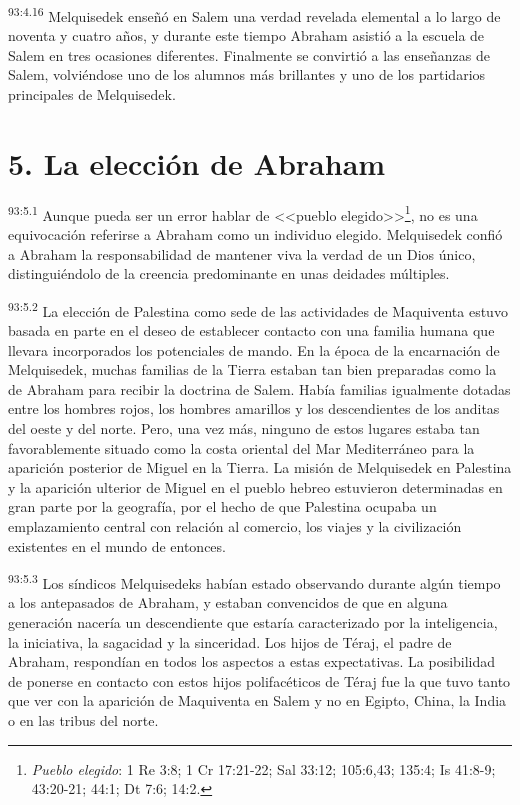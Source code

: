 \par
\textsuperscript{93:4.16} Melquisedek enseñó en Salem una verdad revelada elemental a lo largo de noventa y cuatro años, y durante este tiempo Abraham asistió a la escuela de Salem en tres ocasiones diferentes. Finalmente se convirtió a las enseñanzas de Salem, volviéndose uno de los alumnos más brillantes y uno de los partidarios principales de Melquisedek.

\section*{5. La elección de Abraham}
\par
\textsuperscript{93:5.1} Aunque pueda ser un error hablar de <<pueblo elegido>>\footnote{\textit{Pueblo elegido}: 1 Re 3:8; 1 Cr 17:21-22; Sal 33:12; 105:6,43; 135:4; Is 41:8-9; 43:20-21; 44:1; Dt 7:6; 14:2.}, no es una equivocación referirse a Abraham como un individuo elegido. Melquisedek confió a Abraham la responsabilidad de mantener viva la verdad de un Dios único, distinguiéndolo de la creencia predominante en unas deidades múltiples.

\par
\textsuperscript{93:5.2} La elección de Palestina como sede de las actividades de Maquiventa estuvo basada en parte en el deseo de establecer contacto con una familia humana que llevara incorporados los potenciales de mando. En la época de la encarnación de Melquisedek, muchas familias de la Tierra estaban tan bien preparadas como la de Abraham para recibir la doctrina de Salem. Había familias igualmente dotadas entre los hombres rojos, los hombres amarillos y los descendientes de los anditas del oeste y del norte. Pero, una vez más, ninguno de estos lugares estaba tan favorablemente situado como la costa oriental del Mar Mediterráneo para la aparición posterior de Miguel en la Tierra. La misión de Melquisedek en Palestina y la aparición ulterior de Miguel en el pueblo hebreo estuvieron determinadas en gran parte por la geografía, por el hecho de que Palestina ocupaba un emplazamiento central con relación al comercio, los viajes y la civilización existentes en el mundo de entonces.

\par
\textsuperscript{93:5.3} Los síndicos Melquisedeks habían estado observando durante algún tiempo a los antepasados de Abraham, y estaban convencidos de que en alguna generación nacería un descendiente que estaría caracterizado por la inteligencia, la iniciativa, la sagacidad y la sinceridad. Los hijos de Téraj, el padre de Abraham, respondían en todos los aspectos a estas expectativas. La posibilidad de ponerse en contacto con estos hijos polifacéticos de Téraj fue la que tuvo tanto que ver con la aparición de Maquiventa en Salem y no en Egipto, China, la India o en las tribus del norte.

